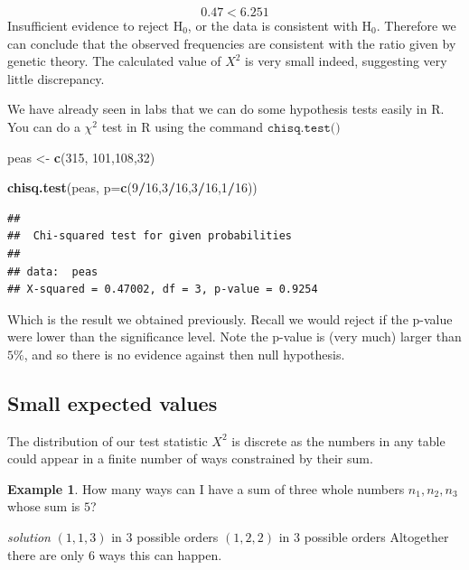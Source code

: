 \documentclass[
]{book}
\newenvironment{Shaded}{\begin{snugshade}}{\end{snugshade}}
\newcommand{\DataTypeTok}[1]{\textcolor[rgb]{0.13,0.29,0.53}{#1}}
\newcommand{\DecValTok}[1]{\textcolor[rgb]{0.00,0.00,0.81}{#1}}
\newcommand{\KeywordTok}[1]{\textcolor[rgb]{0.13,0.29,0.53}{\textbf{#1}}}
\newcommand{\NormalTok}[1]{#1}
\newcommand{\OperatorTok}[1]{\textcolor[rgb]{0.81,0.36,0.00}{\textbf{#1}}}
\newcommand{\StringTok}[1]{\textcolor[rgb]{0.31,0.60,0.02}{#1}}
\theoremstyle{definition}
\theoremstyle{definition}
\newtheorem{example}{Example}[chapter]
\theoremstyle{definition}
\theoremstyle{definition}
\theoremstyle{remark}
\begin{document}
\[0.47 < 6.251\]
Insufficient evidence to reject \(\text{H}_0\), or the data is consistent with \(\text{H}_0\). Therefore we can conclude that the observed frequencies are consistent with the ratio given by genetic theory. The calculated value of \(X^2\) is very small indeed, suggesting very little discrepancy.

We have already seen in labs that we can do some hypothesis tests easily in R. You can do a \(\chi^2\) test in R using the command \(\texttt{chisq.test()}\)

\begin{Shaded}
\begin{Highlighting}[]
\NormalTok{peas <-}\StringTok{ }\KeywordTok{c}\NormalTok{(}\DecValTok{315}\NormalTok{, }\DecValTok{101}\NormalTok{,}\DecValTok{108}\NormalTok{,}\DecValTok{32}\NormalTok{)}

\KeywordTok{chisq.test}\NormalTok{(peas, }\DataTypeTok{p=}\KeywordTok{c}\NormalTok{(}\DecValTok{9}\OperatorTok{/}\DecValTok{16}\NormalTok{,}\DecValTok{3}\OperatorTok{/}\DecValTok{16}\NormalTok{,}\DecValTok{3}\OperatorTok{/}\DecValTok{16}\NormalTok{,}\DecValTok{1}\OperatorTok{/}\DecValTok{16}\NormalTok{))}
\end{Highlighting}
\end{Shaded}

\begin{verbatim}
## 
##  Chi-squared test for given probabilities
## 
## data:  peas
## X-squared = 0.47002, df = 3, p-value = 0.9254
\end{verbatim}

Which is the result we obtained previously. Recall we would reject if the p-value were lower than the significance level. Note the p-value is (very much) larger than \(5\%\), and so there is no evidence against then null hypothesis.

\hypertarget{small-expected-values}{%
\subsection{Small expected values}\label{small-expected-values}}

The distribution of our test statistic \(X^2\) is discrete as the numbers in any table could appear in a finite number of ways constrained by their sum.

\begin{example}
How many ways can I have a sum of three whole numbers \(n_1,n_2,n_3\) whose sum is \(5\)?

\emph{solution}
\((1,1,3)\) in \(3\) possible orders
\((1,2,2)\) in \(3\) possible orders
Altogether there are only \(6\) ways this can happen.
\end{example}
\end{document}
